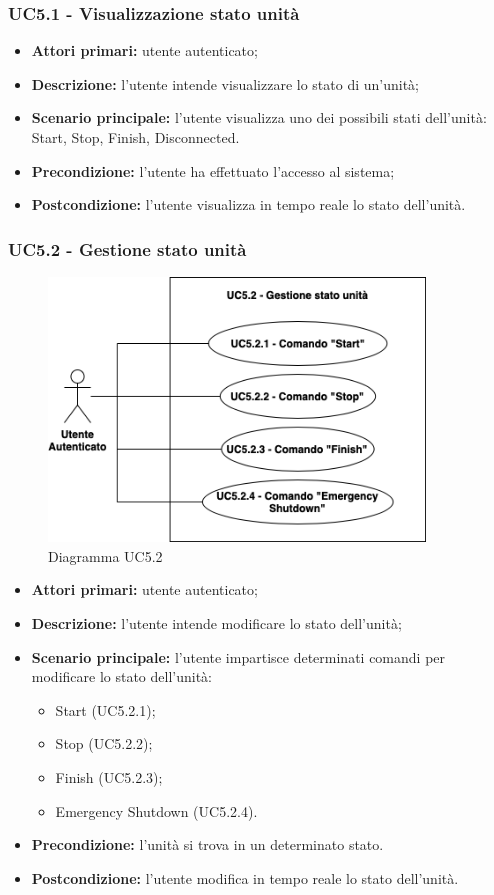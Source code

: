 \subsubsection{UC5.1 - Visualizzazione stato unità}
\begin{itemize}
    \item \textbf{Attori primari:} utente autenticato;
    \item \textbf{Descrizione:} l'utente intende visualizzare lo stato di un'unità;
    \item \textbf{Scenario principale:} l'utente visualizza uno dei possibili stati dell'unità: Start, Stop, Finish, Disconnected.
    \item \textbf{Precondizione:} l'utente ha effettuato l'accesso al sistema;
    \item \textbf{Postcondizione:} l'utente visualizza in tempo reale lo stato dell'unità.
\end{itemize}

\subsubsection{UC5.2 - Gestione stato unità}
\begin{figure}[h!]
    \centering
    \includegraphics[width=10cm]{images/uc5.2.png}
    \caption{Diagramma UC5.2}
\end{figure}
\begin{itemize}
    \item \textbf{Attori primari:} utente autenticato;
    \item \textbf{Descrizione:} l'utente intende modificare lo stato dell'unità;
    \item \textbf{Scenario principale:} l'utente impartisce determinati comandi per modificare lo stato dell'unità:
    \begin{itemize}
        \item Start (UC5.2.1);
        \item Stop (UC5.2.2);
        \item Finish (UC5.2.3);
        \item Emergency Shutdown (UC5.2.4).
    \end{itemize}
    \item \textbf{Precondizione:} l'unità si trova in un determinato stato.
    \item \textbf{Postcondizione:} l'utente modifica in tempo reale lo stato dell'unità.
\end{itemize}

